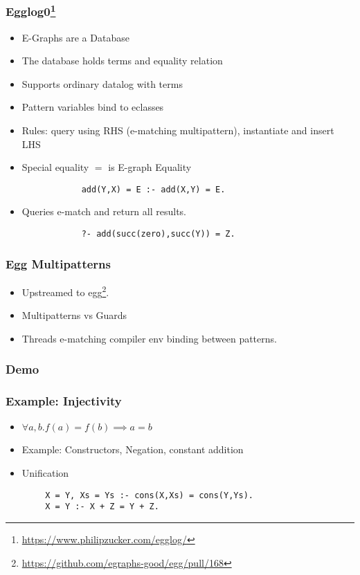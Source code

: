 \documentclass{beamer}
\begin{document}
\begin{frame}[fragile]
    \frametitle{Egglog0\footnote{\url{https://www.philipzucker.com/egglog/}}}
    \begin{itemize}
        \item E-Graphs are a Database
        \item The database holds terms and equality relation
        \item Supports ordinary datalog with terms
        \item Pattern variables bind to eclasses
        \item Rules: query using RHS (e-matching multipattern), instantiate and insert LHS
        \item Special equality $=$ is E-graph Equality
        \begin{lstlisting}
            add(Y,X) = E :- add(X,Y) = E.
        \end{lstlisting}
        \item Queries e-match and return all results.
        \begin{lstlisting}
            ?- add(succ(zero),succ(Y)) = Z.
        \end{lstlisting}
    \end{itemize}


\end{frame}

\begin{frame}
    \frametitle{Egg Multipatterns}
    \begin{itemize}
        \item Upstreamed to egg\footnote{\url{https://github.com/egraphs-good/egg/pull/168}}.
        \item Multipatterns vs Guards %
        \item Threads e-matching compiler env binding between patterns.
    \end{itemize}
\end{frame}


\begin{frame}
    \frametitle{Demo}
\end{frame}

\begin{frame}[fragile]
    \frametitle{Example: Injectivity}
    \begin{itemize}
        \item $\forall a, b. f(a) = f(b) \implies a = b$
        \item Example: Constructors, Negation, constant addition
        \item Unification
    \end{itemize}
    \begin{lstlisting}
        X = Y, Xs = Ys :- cons(X,Xs) = cons(Y,Ys).
        X = Y :- X + Z = Y + Z.
    \end{lstlisting}
\end{frame}
\end{document}
